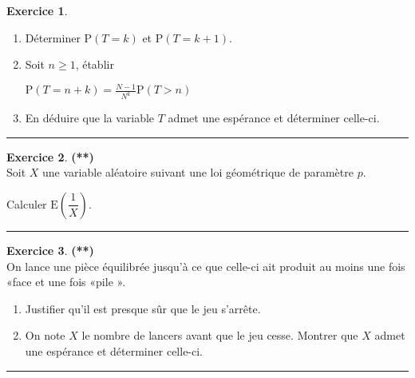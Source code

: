 \documentclass[a4paper,11pt]{article}
\theoremstyle{definition}
\newtheorem{exo}{Exercice} %
\begin{document}
\begin{minipage}{1\linewidth}
\begin{minipage}[t]{0.48\linewidth}
\begin{exo}
			\begin{enumerate}
				\item Déterminer $\mathrm{P}(T=k)$ et $\mathrm{P}(T=k+1)$.
				\item Soit $n \geq 1$, établir
				
				$
				\displaystyle\mathrm{P}(T=n+k)=\frac{N-1}{N^{k}} \mathrm{P}(T>n)
				$
				\item En déduire que la variable $T$ admet une espérance et déterminer celle-ci.
				
			\end{enumerate}  
			
			\centering\rule{1\linewidth}{0.6pt}\end{exo}
		
		\begin{exo}\textbf{(**)}\quad\\[0.2cm]
			
			Soit $X$ une variable aléatoire suivant une loi géométrique de paramètre $p$. 
			
			Calculer $
			\mathrm{E}\left(\dfrac{1}{X}\right) \text {. }
			$
			
			\centering\rule{1\linewidth}{0.6pt}\end{exo}
		
	
		
		
	\end{minipage}\hfill\vrule\hfill\begin{minipage}[t]{0.48\linewidth}\raggedright
		
		\begin{exo}\textbf{(**)}\quad\\[0.2cm]
			On lance une pièce équilibrée jusqu'à ce que celle-ci ait produit au moins une fois «face et une fois «pile ».
			
			\begin{enumerate}
				\item Justifier qu'il est presque sûr que le jeu s'arrête.
				\item On note $X$ le nombre de lancers avant que le jeu cesse. Montrer que $X$ admet une espérance et déterminer celle-ci.
			\end{enumerate}
			
			
			
			\centering\rule{1\linewidth}{0.6pt}\end{exo}
		

\end{minipage}
\end{minipage}
\end{document}
